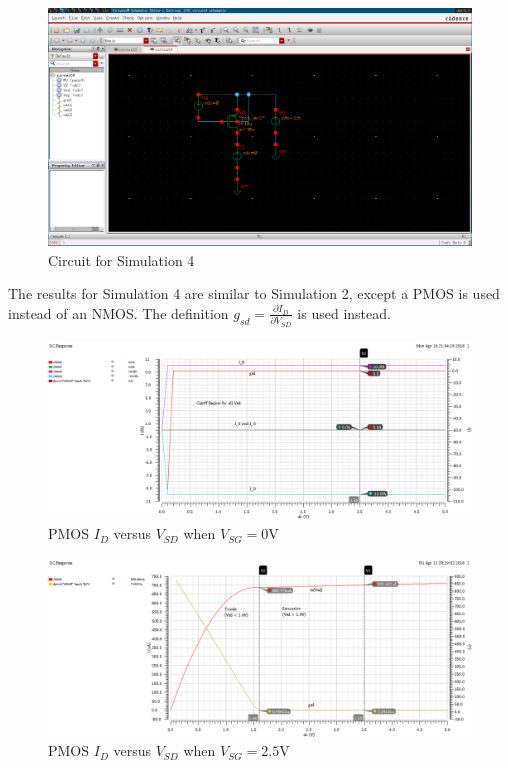 \FloatBarrier

\begin{figure}[h!]
	\centering
	\includegraphics[scale=0.30]{./images/circuit4.PNG}
	\caption{Circuit for Simulation 4}
	\label{fig:circuit4}
\end{figure}

\FloatBarrier
The results for Simulation 4 are similar to Simulation 2, except a PMOS is used instead of an NMOS.
The definition $g_{sd} = \frac{\partial I_{D}}{\partial V_{SD}}$ is used instead.

\FloatBarrier

\begin{figure}[h!]
	\centering
	\includegraphics[scale=0.45]{./images/id_vs_vds_vgs_is_0_pmos.PNG}
	\caption{PMOS $I_{D}$ versus $V_{SD}$ when $V_{SG} = 0$\si{\volt}}
	\label{fig:id_vs_vds_vgs_is_0_pmos}
\end{figure}

\FloatBarrier

\FloatBarrier

\begin{figure}[h!]
	\centering
	\includegraphics[scale=0.45]{./images/id_vs_vds_vgs_is_2_5_pmos.PNG}
	\caption{PMOS $I_{D}$ versus $V_{SD}$ when $V_{SG} = 2.5$\si{\volt}}
	\label{fig:id_vs_vds_vgs_is_2_5_pmos}
\end{figure}


